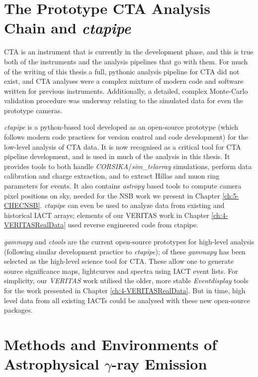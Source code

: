 \section{The Prototype CTA Analysis Chain and \textit{ctapipe}}

CTA is an instrument that is currently in the development phase, and this is true both of the instruments and the analysis pipelines that go with them. For much of the writing of this thesis a full, pythonic analysis pipeline for CTA did not exist, and CTA analyses were a complex mixture of modern code and software written for previous instruments. Additionally, a detailed, complex Monte-Carlo validation procedure was underway relating to the simulated data for even the prototype cameras.

\textit{ctapipe} is a python-based tool developed as an open-source prototype (which follows modern code practices for version control and code development) for the low-level analysis of CTA data. It is now recognised as a critical tool for CTA pipeline development, and is used in much of the analysis in this thesis. It provides tools to both handle \textit{CORSIKA}/\textit{sim\_telarray} simulations, perform data calibration and charge extraction, and to extract Hillas and muon ring parameters for events. It also contains \textit{astropy} based tools to compute camera pixel positions on sky, needed for the NSB work we present in Chapter \ref{ch:5-CHECNSB}. \textit{ctapipe} can even be used to analyze data from existing and historical IACT arrays; elements of our VERITAS work in Chapter \ref{ch:4-VERITASRealData} used reverse engineered code from ctapipe.

\textit{gammapy} and \textit{ctools} are the current open-source prototypes for high-level analysis (following similar development practice to \textit{ctapipe}); of these \textit{gammapy} has been selected as the high-level science tool for CTA. These allow one to generate source significance maps, lightcurves and spectra using IACT event lists. For simplicity, our \textit{VERITAS} work utilised the older, more stable \textit{Eventdisplay} tools for the work presented in Chapter \ref{ch:4-VERITASRealData}. But in time, high level data from all existing IACTs could be analysed with these new open-source packages.

\section{Methods and Environments of Astrophysical \ensuremath{\gamma}-ray Emission}
